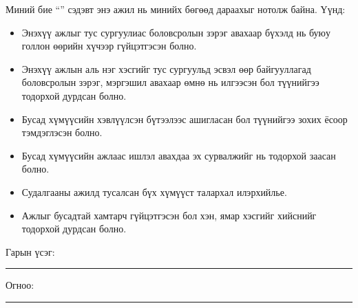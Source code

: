 \begin{declaration}
\addchaptertocentry{\authorshipname}

\noindent Миний бие \shortname{} ``{\ttitle}'' сэдэвт энэ ажил нь минийх бөгөөд дараахыг нотолж байна. Үүнд:

\begin{itemize} 
\item Энэхүү ажлыг тус сургуулиас боловсролын зэрэг авахаар бүхэлд нь буюу голлон өөрийн хүчээр гүйцэтгэсэн болно.
\item Энэхүү ажлын аль нэг хэсгийг тус сургуульд эсвэл өөр байгууллагад боловсролын зэрэг, мэргэшил авахаар өмнө нь илгээсэн бол түүнийгээ тодорхой дурдсан болно.
\item Бусад хүмүүсийн хэвлүүлсэн бүтээлээс ашигласан бол түүнийгээ зохих ёсоор тэмдэглэсэн болно.
\item Бусад хүмүүсийн ажлаас ишлэл авахдаа эх сурвалжийг нь тодорхой заасан болно.
\item Судалгааны ажилд тусалсан бүх хүмүүст талархал илэрхийлье.
\item Ажлыг бусадтай хамтарч гүйцэтгэсэн бол хэн, ямар хэсгийг хийснийг тодорхой дурдсан болно.
\end{itemize}
\bigskip
 
\noindent Гарын үсэг: \rule[-0.5em]{12.7em}{0.5pt}
\bigskip

\noindent Огноо: \rule[-0.5em]{15em}{0.5pt}

\end{declaration}

\clearpage

